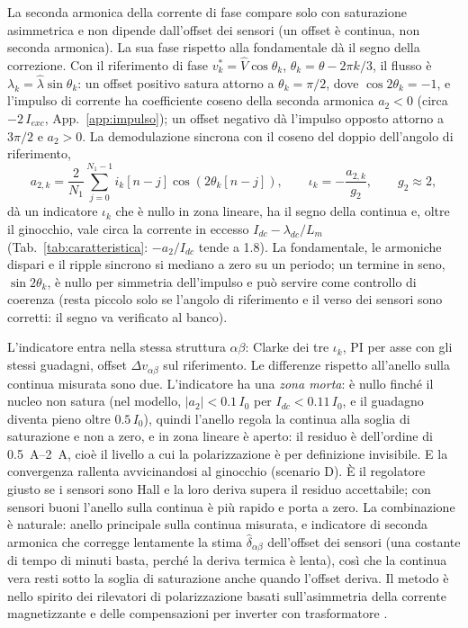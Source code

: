 \documentclass[10pt,a4paper]{scrartcl}
\newcommand{\Lm}{L_m}
\newcommand{\lamhat}{\hat\lambda}
\newcommand{\lamdc}{\lambda_{dc}}
\newcommand{\Idc}{I_{dc}}
\newcommand{\Izero}{I_0}
\newcommand{\ab}{\alpha\beta}
\newcommand{\dvab}{\Delta v_{\ab}}
\begin{document}
\begin{onehalfspace}
La seconda armonica della corrente di fase compare solo con saturazione asimmetrica e non dipende dall'offset dei sensori (un offset è continua, non seconda armonica). La sua fase rispetto alla fondamentale dà il segno della correzione. Con il riferimento di fase $v^*_k = \hat V\cos\theta_k$, $\theta_k = \theta - 2\pi k/3$, il flusso è $\lambda_k = \lamhat\sin\theta_k$: un offset positivo satura attorno a $\theta_k = \pi/2$, dove $\cos 2\theta_k = -1$, e l'impulso di corrente ha coefficiente coseno della seconda armonica $a_2 < 0$ (circa $-2\,I_{exc}$, App.~\ref{app:impulso}); un offset negativo dà l'impulso opposto attorno a $3\pi/2$ e $a_2 > 0$. La demodulazione sincrona con il coseno del doppio dell'angolo di riferimento,
\begin{equation}
a_{2,k} = \frac{2}{N_1}\sum_{j=0}^{N_1-1} i_k[n-j]\cos\!\left(2\theta_k[n-j]\right), \qquad \iota_k = -\frac{a_{2,k}}{g_2}, \qquad g_2 \approx 2 ,
\label{eq:demod}
\end{equation}
dà un indicatore $\iota_k$ che è nullo in zona lineare, ha il segno della continua e, oltre il ginocchio, vale circa la corrente in eccesso $\Idc - \lamdc/\Lm$ (Tab.~\ref{tab:caratteristica}: $-a_2/\Idc$ tende a \num{1.8}). La fondamentale, le armoniche dispari e il ripple sincrono si mediano a zero su un periodo; un termine in seno, $\sin 2\theta_k$, è nullo per simmetria dell'impulso e può servire come controllo di coerenza (resta piccolo solo se l'angolo di riferimento e il verso dei sensori sono corretti: il segno va verificato al banco).

L'indicatore entra nella stessa struttura $\alpha\beta$: Clarke dei tre $\iota_k$, PI per asse con gli stessi guadagni, offset $\dvab$ sul riferimento. Le differenze rispetto all'anello sulla continua misurata sono due. L'indicatore ha una \emph{zona morta}: è nullo finché il nucleo non satura (nel modello, $|a_2| < \num{0.1}\,\Izero$ per $\Idc < \num{0.11}\,\Izero$, e il guadagno diventa pieno oltre $\num{0.5}\,\Izero$), quindi l'anello regola la continua alla soglia di saturazione e non a zero, e in zona lineare è aperto: il residuo è dell'ordine di \SIrange{0.5}{2}{A}, cioè il livello a cui la polarizzazione è per definizione invisibile. E la convergenza rallenta avvicinandosi al ginocchio (scenario D). È il regolatore giusto se i sensori sono Hall e la loro deriva supera il residuo accettabile; con sensori buoni l'anello sulla continua è più rapido e porta a zero. La combinazione è naturale: anello principale sulla continua misurata, e indicatore di seconda armonica che corregge lentamente la stima $\hat\delta_{\ab}$ dell'offset dei sensori (una costante di tempo di minuti basta, perché la deriva termica è lenta), così che la continua vera resti sotto la soglia di saturazione anche quando l'offset deriva. Il metodo è nello spirito dei rilevatori di polarizzazione basati sull'asimmetria della corrente magnetizzante \cite{buticchi2013} e delle compensazioni per inverter con trasformatore \cite{buticchi2011, blewitt2010}.


\end{onehalfspace}
\end{document}

